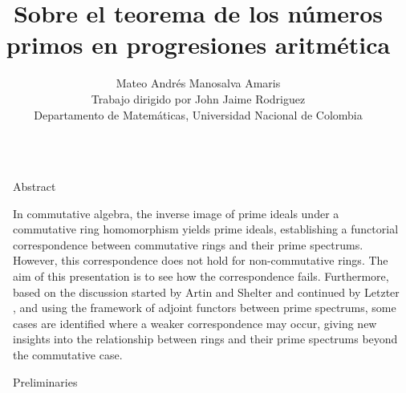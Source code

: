 \documentclass[final]{beamer}
\title{Sobre el teorema de los números primos en progresiones aritmética}
\author{Mateo Andrés Manosalva Amaris\\Trabajo dirigido por John Jaime Rodriguez\\Departamento de Matemáticas, Universidad Nacional de Colombia}
\institute[shortinst]{\texttt{mmanosalva@unal.edu.co}}
\newlength{\sepwidth}
\newlength{\colwidth}
\newcommand{\separatorcolumn}{\begin{column}{\sepwidth}\end{column}}
\begin{document}
\begin{frame}[t, fragile]
\begin{columns}[t]
\separatorcolumn

\begin{column}{\colwidth}

  \begin{block}{Abstract}

    In commutative algebra, the inverse image of prime ideals under a commutative ring homomorphism yields prime ideals, establishing a functorial correspondence between commutative rings and their prime spectrums. However, this correspondence does not hold for non-commutative rings. The aim of this presentation is to see how the correspondence fails. Furthermore, based on the discussion started by Artin and Shelter \textbf{\cite{Artin}} and continued by Letzter \textbf{\cite{Letzter}}, and using the framework of adjoint functors between prime spectrums, some cases are identified where a weaker correspondence may occur, giving new insights into the relationship between rings and their prime spectrums beyond the commutative case.

  \end{block}

  \begin{block}{Preliminaries}


\end{block}
\end{column}
\end{columns}
\end{frame}
\end{document}
